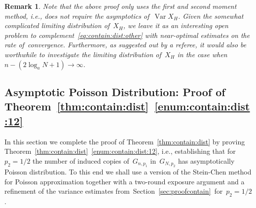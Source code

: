 \documentclass{article}
\newcommand\Var{\operatorname{Var}}
\newtheorem{remark}{Remark}
\newcommand{\refT}[1]{Theorem~\ref{#1}}
\newcommand{\refS}[1]{Section~\ref{#1}}
\begin{document}
\begin{remark}\label{rem:sec:contain:dist}
Note that the above proof only uses the first and second moment method, i.e., does not require the asymptotics of~$\Var X_H$.
Given the somewhat complicated limiting distribution of~$X_H$, we leave it as an interesting open problem to complement~\eqref{eq:contain:dist:other} with near-optimal estimates on the rate of~convergence. 
Furthermore, as suggested out by a referee, it would also be worthwhile to investigate the limiting distribution of~$X_H$ in the case when~$n-(2\log_a N+1) \to \infty$. 
\end{remark}



\subsection{Asymptotic Poisson Distribution: Proof of \refT{thm:contain:dist}~\ref{enum:contain:dist:12}}\label{sec:contain:dist:poisson}
In this section we complete the proof of \refT{thm:contain:dist} by proving \refT{thm:contain:dist}~\ref{enum:contain:dist:12}, i.e., establishing that for~${p_2 =1/2}$ the number of induced copies of~$G_{n,p_1}$ in~$G_{N,p_2}$ has asymptotically Poisson distribution. 
To this end we shall use a version of the Stein-Chen method for Poisson approximation together with a two-round exposure argument and a refinement of the variance estimates from~\refS{sec:proofcontain}~for~${p_2=1/2}$.  
\end{document}
